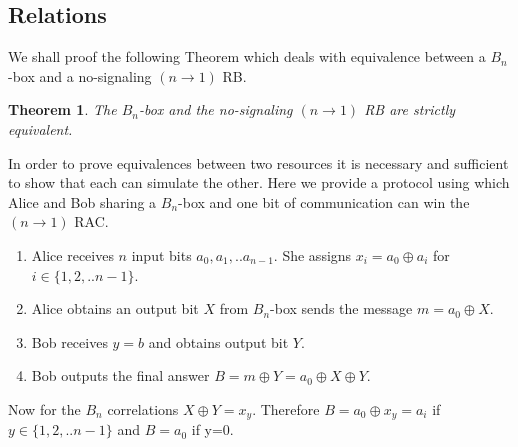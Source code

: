 \documentclass[%
 reprint,
 amsmath,amssymb,
 aps,
]{revtex4-1}
\newtheorem{mydef1}{Theorem}
\begin{document}
\subsection*{Relations}
\noindent We shall proof the following Theorem which deals with equivalence between a $B_n$-box and a no-signaling $(n\rightarrow 1)$ RB.
\begin{mydef1} \label{thm1}
The $B_n$-box and the no-signaling $(n\rightarrow 1)$ RB are strictly equivalent.
\end{mydef1}
In order to prove equivalences between two resources it is necessary and sufficient to show that each can simulate the other. Here we provide a protocol using which Alice and Bob sharing a $B_n$-box and one bit of communication can win the $(n\rightarrow1)$ RAC. 
\begin{enumerate}
\item Alice receives $n$ input bits $a_0,a_1,..a_{n-1}$. She assigns $x_i=a_0\oplus a_i$ for $i\in\{1,2,..n-1\}$.
\item Alice obtains an output bit $X$ from $B_n$-box sends the message $m=a_0\oplus X$.
\item  Bob receives $y=b$ and obtains output bit  $Y$. 
\item Bob outputs the final answer $B=m\oplus Y=a_0\oplus X \oplus Y$.  
\end{enumerate}
\noindent Now for the $B_n$ correlations $X\oplus Y=x_y$. Therefore $B=a_0\oplus x_y=a_i$ if $y\in\{1,2,..n-1\}$ and $B=a_0$ if y=0.
\end{document}
